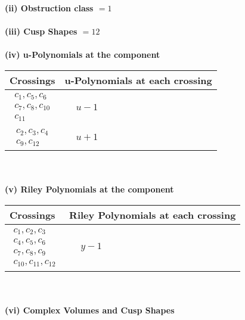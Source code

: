 \documentclass[1p]{elsarticle_modified}
\theoremstyle{definition}
\begin{document}
\flushleft \textbf{(ii) Obstruction class $= 1$}\\~\\
\flushleft \textbf{(iii) Cusp Shapes $= 12$}\\~\\
\newpage\renewcommand{\arraystretch}{1}
\flushleft \textbf{(iv) u-Polynomials at the component}\newline \\
\begin{tabular}{m{50pt}|m{274pt}}
Crossings & \hspace{64pt}u-Polynomials at each crossing \\
\hline $$\begin{aligned}c_{1},c_{5},c_{6}\\c_{7},c_{8},c_{10}\\c_{11}\end{aligned}$$&$\begin{aligned}
&u-1
\end{aligned}$\\
\hline $$\begin{aligned}c_{2},c_{3},c_{4}\\c_{9},c_{12}\end{aligned}$$&$\begin{aligned}
&u+1
\end{aligned}$\\
\hline
\end{tabular}\\~\\
\newpage\renewcommand{\arraystretch}{1}
\flushleft \textbf{(v) Riley Polynomials at the component}\newline \\
\begin{tabular}{m{50pt}|m{274pt}}
Crossings & \hspace{64pt}Riley Polynomials at each crossing \\
\hline $$\begin{aligned}c_{1},c_{2},c_{3}\\c_{4},c_{5},c_{6}\\c_{7},c_{8},c_{9}\\c_{10},c_{11},c_{12}\end{aligned}$$&$\begin{aligned}
&y-1
\end{aligned}$\\
\hline
\end{tabular}\\~\\
\newpage\flushleft \textbf{(vi) Complex Volumes and Cusp Shapes}
\end{document}
